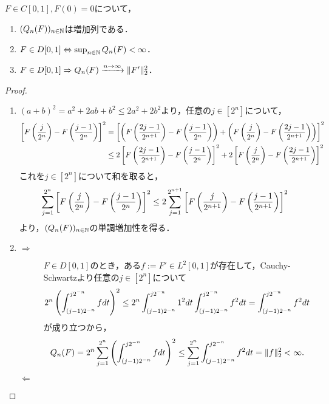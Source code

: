 \documentclass[uplatex,dvipdfmx]{jsreport}
\begin{document}
\begin{lemma}
    $F\in C[0,1],F(0)=0$について，
    \begin{enumerate}
        \item $(Q_n(F))_{n\in\mathbb{N}}$は増加列である．
        \item $F\in D[0,1]\Leftrightarrow\sup_{n\in\mathbb{N}}Q_n(F)<\infty$．
        \item $F\in D[0,1]\Rightarrow Q_n(F)\xrightarrow{n\to\infty}\|F'\|^2_2$．
    \end{enumerate}
\end{lemma}
\begin{proof}\mbox{}
    \begin{enumerate}
        \item $(a+b)^2=a^2+2ab+b^2\le 2a^2+2b^2$より，任意の$j\in[2^n]$について，
        \begin{align*}
            \left[F\left(\frac{j}{2^n}\right)-F\left(\frac{j-1}{2^n}\right)\right]^2&=\left[\left(F\left(\frac{2j-1}{2^{n+1}}\right)-F\left(\frac{j-1}{2^n}\right)\right)+\left(F\left(\frac{j}{2^n}\right)-F\left(\frac{2j-1}{2^{n+1}}\right)\right)\right]^2\\
            &\le2\left[F\left(\frac{2j-1}{2^{n+1}}\right)-F\left(\frac{j-1}{2^n}\right)\right]^2+2\left[F\left(\frac{j}{2^n}\right)-F\left(\frac{2j-1}{2^{n+1}}\right)\right]^2
        \end{align*}
        これを$j\in[2^n]$について和を取ると，
        \[\sum^{2^n}_{j=1}\left[F\left(\frac{j}{2^n}\right)-F\left(\frac{j-1}{2^n}\right)\right]^2\le 2\sum^{2^{n+1}}_{j=1}\left[F\left(\frac{j}{2^{n+1}}\right)-F\left(\frac{j-1}{2^{n+1}}\right)\right]^2\]
        より，$(Q_n(F))_{n\in\mathbb{N}}$の単調増加性を得る．
        \item \begin{description}
            \item[$\Rightarrow$] $F\in D[0,1]$のとき，ある$f:=F'\in L^2[0,1]$が存在して，Cauchy-Schwartzより任意の$j\in[2^n]$について
            \[2^n\left(\int^{j2^{-n}}_{(j-1)2^{-n}}fdt\right)^2\le 2^n\int^{j2^{-n}}_{(j-1)2^{-n}}1^2dt\int^{j2^{-n}}_{(j-1)2^{-n}}f^2dt=\int^{j2^{-n}}_{(j-1)2^{-n}}f^2dt\]
            が成り立つから，
            \[Q_n(F)=2^n\sum^{2^n}_{j=1}\left(\int^{j2^{-n}}_{(j-1)2^{-n}}fdt\right)^2\le \sum^{2^n}_{j=1}\int^{j2^{-n}}_{(j-1)2^{-n}}f^2dt=\|f\|_2^2<\infty.\]
            \item[$\Leftarrow$]

        \end{description}
    \end{enumerate}
\end{proof}
\end{document}
